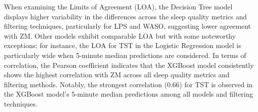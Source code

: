 \documentclass[
  9pt,
]{scrbook}
\begin{document}
When examining the Limits of Agreement (LOA), the Decision Tree model
displays higher variability in the differences across the sleep quality
metrics and filtering techniques, particularly for LPS and WASO,
suggesting lower agreement with ZM. Other models exhibit comparable LOA
but with some noteworthy exceptions; for instance, the LOA for TST in
the Logistic Regression model is particularly wide when 5-minute median
predictions are considered. In terms of correlation, the Pearson
coefficient indicates that the XGBoost model consistently shows the
highest correlation with ZM across all sleep quality metrics and
filtering methods. Notably, the strongest correlation (0.66) for TST is
observed in the XGBoost model's 5-minute median predictions among all
models and filtering techniques.

\begingroup

\footnotesize
\end{document}
